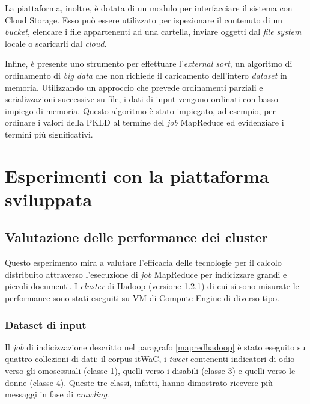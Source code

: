 La piattaforma, inoltre, è dotata di un modulo per interfacciare il sistema con Cloud Storage. Esso può essere utilizzato per ispezionare il contenuto di un \textit{bucket}, elencare i 
file appartenenti ad una cartella, inviare oggetti dal \textit{file system} locale o scaricarli dal \textit{cloud}.

Infine, è presente uno strumento per effettuare l’\textit{external sort}, un algoritmo di ordinamento di \textit{big data} che non richiede il caricamento dell’intero \textit{dataset} in memoria.
Utilizzando un approccio che prevede ordinamenti parziali e serializzazioni successive su file, i dati di input vengono ordinati con basso impiego di memoria.
Questo algoritmo è stato impiegato, ad esempio, per ordinare i valori della PKLD al termine del \textit{job} MapReduce ed evidenziare i termini più significativi. 

\chapter{Esperimenti con la piattaforma sviluppata}
\label{chap:esp}

\section{Valutazione delle performance dei cluster}

Questo esperimento mira a valutare l'efficacia delle tecnologie per il calcolo distribuito attraverso l'esecuzione di \textit{job} MapReduce per indicizzare grandi e piccoli documenti.
I \textit{cluster} di Hadoop (versione 1.2.1) di cui si sono misurate le performance sono stati eseguiti su VM di Compute Engine di diverso tipo.


\subsection{Dataset di input}
\label{esphadoop:dataset}

Il \textit{job} di indicizzazione descritto nel paragrafo \ref{mapredhadoop} è stato eseguito su quattro collezioni di dati: il corpus itWaC, i \textit{tweet} contenenti indicatori di odio verso gli omosessuali 
(classe 1), quelli verso i disabili (classe 3) e quelli verso le donne (classe 4). Queste tre classi, infatti, hanno dimostrato ricevere più messaggi in fase di \textit{crawling}.

